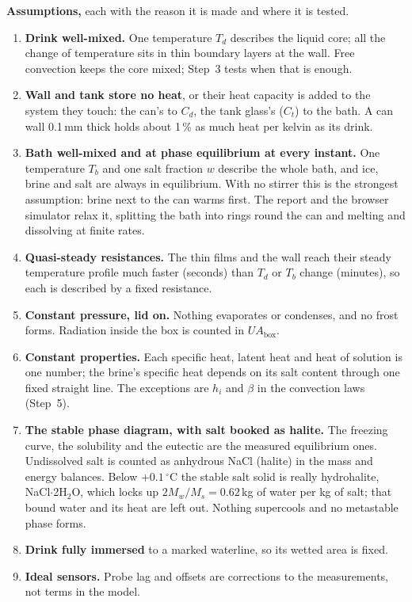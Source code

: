 \documentclass[11pt,a4paper]{article}
\newcommand{\UAbox}{UA_{\mathrm{box}}}
\newcommand{\dC}{\,{}^{\circ}\mathrm{C}}
\begin{document}
\begin{assume}
\textbf{Assumptions,} each with the reason it is made and where it is tested.
\begin{enumerate}[label=\textbf{A\arabic*}]
\item \textbf{Drink well-mixed.} One temperature $T_d$ describes the liquid core; all the change of
  temperature sits in thin boundary layers at the wall. Free convection keeps the core mixed; Step~3
  tests when that is enough.
\item \textbf{Wall and tank store no heat}, or their heat capacity is added to the system they touch:
  the can's to $C_d$, the tank glass's ($C_t$) to the bath. A can wall 0.1\,mm thick holds about 1\,\%
  as much heat per kelvin as its drink.
\item \textbf{Bath well-mixed and at phase equilibrium at every instant.} One temperature $T_b$ and one
  salt fraction $w$ describe the whole bath, and ice, brine and salt are always in equilibrium. With no
  stirrer this is the strongest assumption: brine next to the can warms first. The report and the
  browser simulator relax it, splitting the bath into rings round the can and melting and dissolving at
  finite rates.
\item \textbf{Quasi-steady resistances.} The thin films and the wall reach their steady temperature
  profile much faster (seconds) than $T_d$ or $T_b$ change (minutes), so each is described by a fixed
  resistance.
\item \textbf{Constant pressure, lid on.} Nothing evaporates or condenses, and no frost forms. Radiation
  inside the box is counted in $\UAbox$.
\item \textbf{Constant properties.} Each specific heat, latent heat and heat of solution is one number;
  the brine's specific heat depends on its salt content through one fixed straight line. The
  exceptions are $h_i$ and $\beta$ in the convection laws (Step~5).
\item \textbf{The stable phase diagram, with salt booked as halite.} The freezing curve, the solubility
  and the eutectic are the measured equilibrium ones. Undissolved salt is counted as anhydrous NaCl
  (halite) in the mass and energy balances. Below $+0.1\dC$ the stable salt solid is really hydrohalite,
  NaCl$\cdot$2H$_2$O, which locks up $2M_w/M_s = 0.62$\,kg of water per kg of salt; that bound water and
  its heat are left out. Nothing supercools and no metastable phase forms.
\item \textbf{Drink fully immersed} to a marked waterline, so its wetted area is fixed.
\item \textbf{Ideal sensors.} Probe lag and offsets are corrections to the measurements, not terms in
  the model.
\end{enumerate}
\end{assume}
\end{document}
